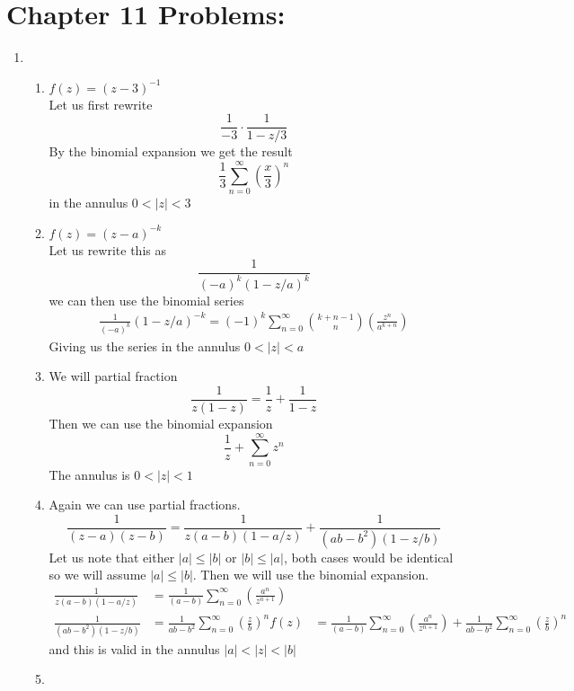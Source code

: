 \documentclass{article}
\begin{document}
  \section{Chapter 11 Problems:}
  \begin{enumerate}
    \item
      \begin{enumerate}[label=(\roman*)]
        \item$f(z)=(z-3)^{-1}$\\
          Let us first rewrite
          \[\frac{1}{-3}\cdot\frac{1}{1-z/3}\]
          By the binomial expansion we get the result
          \[\frac{1}{3}\sum_{n=0}^\infty\left(\frac{x}{3}\right)^n\]
          in the annulus $0<|z|<3$
        \item$f(z)=(z-a)^{-k}$\\
          Let us rewrite this as
          \[\frac{1}{(-a)^k(1-z/a)^k}\]
          we can then use the binomial series
          \begin{align*}
            \frac{1}{(-a)^k}(1-z/a)^{-k}=
            (-1)^{k}\sum_{n=0}^\infty
              \binom{k+n-1}{n}\left(\frac{z^n}{a^{k+n}}\right)
          \end{align*}
          Giving us the series
          in the annulus $0<|z|<a$
        \item
          We will partial fraction
          \[\frac{1}{z(1-z)}=\frac{1}{z}+\frac{1}{1-z}\]
          Then we can use the binomial expansion
          \[\frac{1}{z}+\sum_{n=0}^\infty z^n\]
          The annulus is $0<|z|<1$
        \item
          Again we can use partial fractions.
          \[\frac{1}{(z-a)(z-b)}=\frac{1}{z(a-b)(1-a/z)}+\frac{1}{(ab-b^2)(1-z/b)}\]
          Let us note that either $|a|\leq|b|$ or $|b|\leq|a|$, both cases would be identical so we will assume $|a|\leq|b|$. Then we will use the binomial expansion.
          \begin{align*}
            \frac{1}{z(a-b)(1-a/z)}
            &=\frac{1}{(a-b)}\sum_{n=0}^\infty\left(\frac{a^n}{z^{n+1}}\right)\\
            \frac{1}{(ab-b^2)(1-z/b)}
            &=\frac{1}{ab-b^2}\sum_{n=0}^\infty\left(\frac{z}{b}\right)^n
            f(z)&=\frac{1}{(a-b)}\sum_{n=0}^\infty
              \left(\frac{a^n}{z^{n+1}}\right)
            +\frac{1}{ab-b^2}\sum_{n=0}^\infty
              \left(\frac{z}{b}\right)^n
          \end{align*}
          and this is valid in the annulus $|a|<|z|<|b|$
        \item

\end{enumerate}
\end{enumerate}
\end{document}
